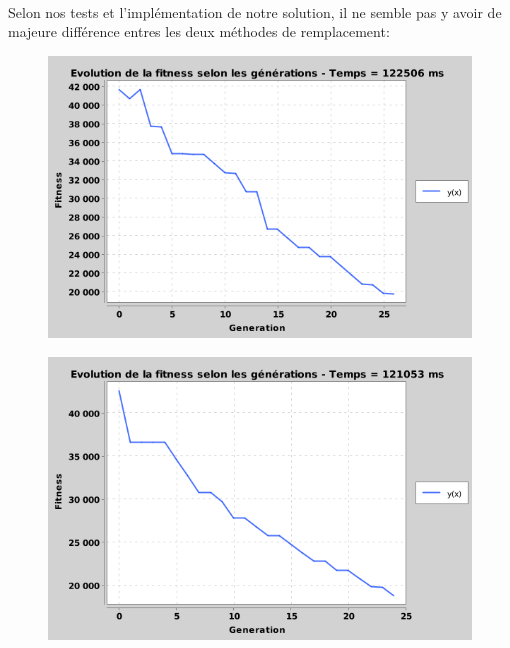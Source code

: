 	\paragraph{} Selon nos tests et l'implémentation de notre solution, il ne semble pas y avoir de majeure différence entres les deux méthodes de remplacement:

	\begin{figure}[H]
	\centering
		\begin{minipage}{.5\textwidth}
		  \centering
		  \includegraphics[width=1\linewidth]{images/OnlyBest}
		  \label{fig:test1}
		\end{minipage}%
		\begin{minipage}{.5\textwidth}
		  \centering
		  \includegraphics[width=1\linewidth]{images/OnlyChildrens}
		  \label{fig:test2}
		\end{minipage}
	\end{figure}

